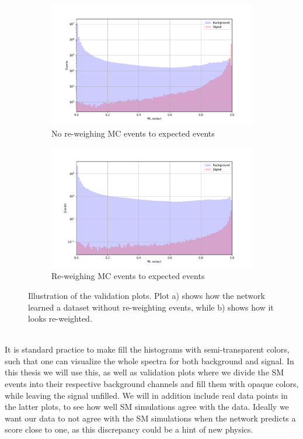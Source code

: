 \documentclass[12pt, a4paper]{book}
\begin{document}
\begin{figure}[!ht]
	\centering
    \begin{subfigure}[b]{0.7\textwidth}
        \centering
        \includegraphics[width=\textwidth]{VAL_unscaled.pdf}
        \caption{No re-weighing MC events to expected events}
    \end{subfigure}
    \hfill
    \begin{subfigure}[b]{0.7\textwidth}
        \centering
        \includegraphics[width=\textwidth]{VAL.pdf}
        \caption{Re-weighing MC events to expected events}
    \end{subfigure}
    \caption[Validation plots illustration]{Illustration of the validation plots. Plot a) shows how the network learned a dataset without re-weighting events, while b) shows how it looks re-weighted.}\label{fig:VAL}
\end{figure}
\\It is standard practice to make fill the histograms with semi-transparent colors, such that one can visualize the whole spectra for both background and signal. In this thesis we will use this, as well as validation plots where we divide the SM events into their respective background channels and fill them with opaque 
colors, while leaving the signal unfilled. We will in addition include real data points in the latter plots, to see how well SM simulations agree with the data. Ideally we want our data to not agree with the SM simulations when the network 
predicts a score close to one, as this discrepancy could be a hint of new physics.
\end{document}
